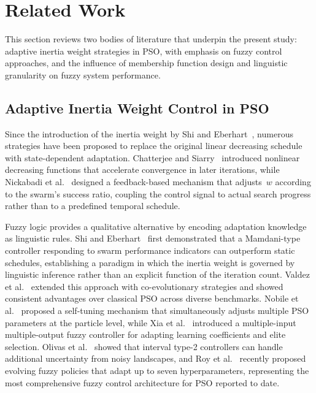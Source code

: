 \section{Related Work}
\label{sec:related_work}

This section reviews two bodies of literature that underpin the present study: adaptive inertia weight strategies in PSO, with emphasis on fuzzy control approaches, and the influence of membership function design and linguistic granularity on fuzzy system performance.

\subsection{Adaptive Inertia Weight Control in PSO}
\label{subsec:rw_adaptive_w}

Since the introduction of the inertia weight by Shi and Eberhart~\cite{shi1998modified}, numerous strategies have been proposed to replace the original linear decreasing schedule with state-dependent adaptation. Chatterjee and Siarry~\cite{chatterjee2006nonlinear} introduced nonlinear decreasing functions that accelerate convergence in later iterations, while Nickabadi et al.~\cite{nickabadi2011novel} designed a feedback-based mechanism that adjusts~$w$ according to the swarm's success ratio, coupling the control signal to actual search progress rather than to a predefined temporal schedule.

Fuzzy logic provides a qualitative alternative by encoding adaptation knowledge as linguistic rules. Shi and Eberhart~\cite{shi2001fuzzy} first demonstrated that a Mamdani-type controller responding to swarm performance indicators can outperform static schedules, establishing a paradigm in which the inertia weight is governed by linguistic inference rather than an explicit function of the iteration count. Valdez et al.~\cite{valdez2017comparative} extended this approach with co-evolutionary strategies and showed consistent advantages over classical PSO across diverse benchmarks. Nobile et al.~\cite{nobile2018fuzzy} proposed a self-tuning mechanism that simultaneously adjusts multiple PSO parameters at the particle level, while Xia et al.~\cite{xia2022particle} introduced a multiple-input multiple-output fuzzy controller for adapting learning coefficients and elite selection. Olivas et al.~\cite{olivas2014comparative} showed that interval type-2 controllers can handle additional uncertainty from noisy landscapes, and Roy et al.~\cite{roy2024hyperparameter} recently proposed evolving fuzzy policies that adapt up to seven hyperparameters, representing the most comprehensive fuzzy control architecture for PSO reported to date.

